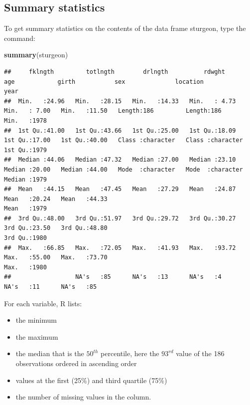 \documentclass[
  12pt,
]{book}
\newenvironment{Shaded}{\begin{snugshade}}{\end{snugshade}}
\newcommand{\KeywordTok}[1]{\textcolor[rgb]{0.13,0.29,0.53}{\textbf{#1}}}
\newcommand{\NormalTok}[1]{#1}
\providecommand{\tightlist}{%
  \setlength{\itemsep}{0pt}\setlength{\parskip}{0pt}}
\begin{document}
\hypertarget{summary-statistics}{%
\subsection{Summary statistics}\label{summary-statistics}}

To get summary statistics on the contents of the data frame sturgeon, type the command:

\begin{Shaded}
\begin{Highlighting}[]
\KeywordTok{summary}\NormalTok{(sturgeon)}
\end{Highlighting}
\end{Shaded}

\begin{verbatim}
##     fklngth         totlngth        drlngth          rdwght           age            girth           sex              location              year     
##  Min.   :24.96   Min.   :28.15   Min.   :14.33   Min.   : 4.73   Min.   : 7.00   Min.   :11.50   Length:186         Length:186         Min.   :1978  
##  1st Qu.:41.00   1st Qu.:43.66   1st Qu.:25.00   1st Qu.:18.09   1st Qu.:17.00   1st Qu.:40.00   Class :character   Class :character   1st Qu.:1979  
##  Median :44.06   Median :47.32   Median :27.00   Median :23.10   Median :20.00   Median :44.00   Mode  :character   Mode  :character   Median :1979  
##  Mean   :44.15   Mean   :47.45   Mean   :27.29   Mean   :24.87   Mean   :20.24   Mean   :44.33                                         Mean   :1979  
##  3rd Qu.:48.00   3rd Qu.:51.97   3rd Qu.:29.72   3rd Qu.:30.27   3rd Qu.:23.50   3rd Qu.:48.80                                         3rd Qu.:1980  
##  Max.   :66.85   Max.   :72.05   Max.   :41.93   Max.   :93.72   Max.   :55.00   Max.   :73.70                                         Max.   :1980  
##                  NA's   :85      NA's   :13      NA's   :4       NA's   :11      NA's   :85
\end{verbatim}

For each variable, R lists:

\begin{itemize}
\tightlist
\item
  the minimum
\item
  the maximum
\item
  the median that is the \(50^{th}\) percentile, here the \(93^{rd}\) value of the 186 observations ordered in ascending order
\item
  values at the first (25\%) and third quartile (75\%)
\item
  the number of missing values in the column.
\end{itemize}
\end{document}
